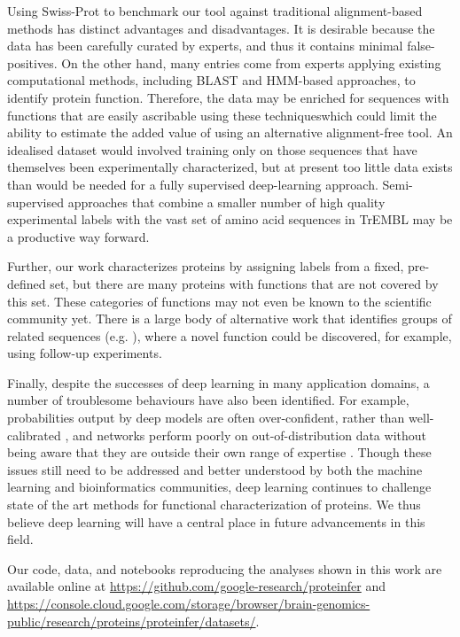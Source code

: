 Using Swiss-Prot to benchmark our tool against traditional alignment-based methods has distinct advantages and disadvantages. It is desirable because the data has been carefully curated by experts, and thus it contains minimal false-positives. On the other hand, many entries come from experts applying existing computational methods, including BLAST and HMM-based approaches, to identify protein function. Therefore, the data may be enriched for sequences with functions that are easily ascribable using these techniqueswhich could limit the ability to estimate the added value of using an alternative alignment-free tool. An idealised dataset would involved training only on those sequences that have themselves been experimentally characterized, but at present  too little data exists than would be needed for a fully supervised deep-learning approach. Semi-supervised approaches that combine a smaller number of high quality experimental labels with the vast set of amino acid sequences in TrEMBL may be a productive way forward.

Further, our work characterizes proteins by assigning labels from a fixed, pre-defined set, but there are many proteins with functions that are not covered by this set. These categories of functions may not even be known to the scientific community yet. There is a large body of alternative work that identifies groups of related sequences (e.g. \cite{pmid12952885}), where a novel function could be discovered, for example, using follow-up experiments.

Finally, despite the successes of deep learning in many application domains, a number of troublesome behaviours have also been identified. For example, probabilities output by deep models are often over-confident, rather than well-calibrated \citep{guo}, and networks perform poorly on out-of-distribution data without being aware that they are outside their own range of expertise \citep{amoidei}. Though these issues still need to be addressed and better understood by both the machine learning and bioinformatics communities, deep learning continues to challenge state of the art methods for functional characterization of proteins. We thus believe deep learning will have a central place in future advancements in this field.



Our code, data, and notebooks reproducing the analyses shown in this work are available online at \url{https://github.com/google-research/proteinfer} and \url{https://console.cloud.google.com/storage/browser/brain-genomics-public/research/proteins/proteinfer/datasets/}.
\begin{acknowledgements}
\end{acknowledgements}
